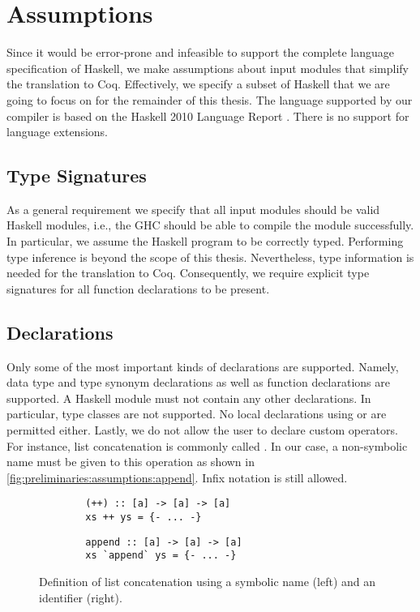 \section{Assumptions} \label{sec:preliminaries:assumptions}
Since it would be error-prone and infeasible to support the complete language specification of Haskell, we make assumptions about input modules that simplify the translation to Coq.
Effectively, we specify a subset of Haskell that we are going to focus on for the remainder of this thesis.
The language supported by our compiler is based on the Haskell 2010 Language Report \citep{Marlow:2010}.
There is no support for language extensions.

\subsection{Type Signatures}
As a general requirement we specify that all input modules should be valid Haskell modules, i.e., the GHC should be able to compile the module successfully.
In particular, we assume the Haskell program to be correctly typed.
Performing type inference is beyond the scope of this thesis.
Nevertheless, type information is needed for the translation to Coq.
Consequently, we require explicit type signatures for all function declarations to be present.

\subsection{Declarations}
Only some of the most important kinds of declarations are supported.
Namely, data type and type synonym declarations as well as function declarations are supported.
A Haskell module must not contain any other declarations.
In particular, type classes are not supported.
No local declarations using  or  are permitted either.
Lastly, we do not allow the user to declare custom operators.
For instance, list concatenation is commonly called \haskell{(++)}.
In our case, a non-symbolic name must be given to this operation as shown in \autoref{fig:preliminaries:assumptions:append}.
Infix notation is still allowed.

\begin{figure}[H]
  \begin{center}
    \begin{minipage}[t]{0.45\textwidth}
      \begin{verbatim}
        (++) :: [a] -> [a] -> [a]
        xs ++ ys = {- ... -}
      \end{verbatim}
    \end{minipage}
    \begin{minipage}[t]{0.45\textwidth}
      \begin{verbatim}
        append :: [a] -> [a] -> [a]
        xs `append` ys = {- ... -}
      \end{verbatim}
    \end{minipage}
  \end{center}
  \caption{Definition of list concatenation using a symbolic name (left) and an identifier (right).}
  \label{fig:preliminaries:assumptions:append}
\end{figure}

